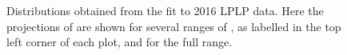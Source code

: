 \begin{figure}[h!]
\caption{Distributions obtained from the fit to 2016 LPLP data. Here the projections of \MJO are shown for several ranges of \MVV, as labelled in the top left corner of each plot, and for the full \MJT range.}
\label{fig:postfitLPLP_X}
\end{figure}
